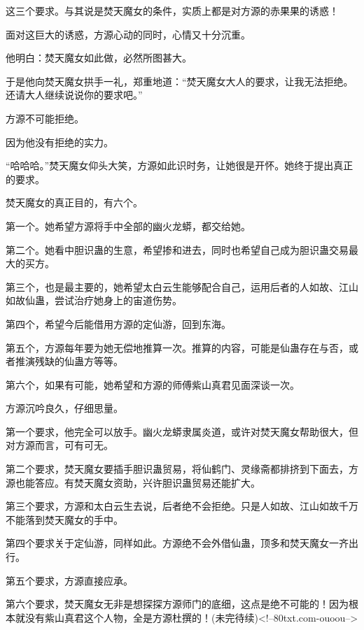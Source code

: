 \begin{this_body}
这三个要求。与其说是焚天魔女的条件，实质上都是对方源的赤果果的诱惑！

面对这巨大的诱惑，方源心动的同时，心情又十分沉重。

他明白：焚天魔女如此做，必然所图甚大。

于是他向焚天魔女拱手一礼，郑重地道：“焚天魔女大人的要求，让我无法拒绝。还请大人继续说说你的要求吧。”

方源不可能拒绝。

因为他没有拒绝的实力。

“哈哈哈。”焚天魔女仰头大笑，方源如此识时务，让她很是开怀。她终于提出真正的要求。

焚天魔女的真正目的，有六个。

第一个。她希望方源将手中全部的幽火龙蟒，都交给她。

第二个。她看中胆识蛊的生意，希望掺和进去，同时也希望自己成为胆识蛊交易最大的买方。

第三个，也是最主要的，她希望太白云生能够配合自己，运用后者的人如故、江山如故仙蛊，尝试治疗她身上的宙道伤势。

第四个，希望今后能借用方源的定仙游，回到东海。

第五个，方源每年要为她无偿地推算一次。推算的内容，可能是仙蛊存在与否，或者推演残缺的仙蛊方等等。

第六个，如果有可能，她希望和方源的师傅紫山真君见面深谈一次。

方源沉吟良久，仔细思量。

第一个要求，他完全可以放手。幽火龙蟒隶属炎道，或许对焚天魔女帮助很大，但对方源而言，可有可无。

第二个要求，焚天魔女要插手胆识蛊贸易，将仙鹤门、灵缘斋都排挤到下面去，方源也能答应。有焚天魔女资助，兴许胆识蛊贸易还能扩大。

第三个要求，方源和太白云生去说，后者绝不会拒绝。只是人如故、江山如故千万不能落到焚天魔女的手中。

第四个要求关于定仙游，同样如此。方源绝不会外借仙蛊，顶多和焚天魔女一齐出行。

第五个要求，方源直接应承。

第六个要求，焚天魔女无非是想探探方源师门的底细，这点是绝不可能的！因为根本就没有紫山真君这个人物，全是方源杜撰的！(未完待续)<!--80txt.com-ouoou-->

\end{this_body}

